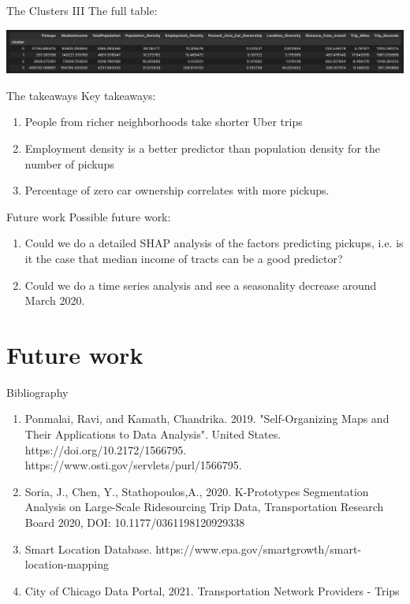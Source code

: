 \documentclass{beamer}
\begin{document}
\begin{frame}{The Clusters III}
	The full table:
	\begin{center}
	\includegraphics[scale=0.25]{full-table.png}
	\end{center}
\end{frame}
\begin{frame}{The takeaways}
	Key takeaways:
	\begin{enumerate}
		\item People from richer neighborhoods take shorter Uber trips
		\item Employment density is a better predictor than population density for the number of pickups
		\item Percentage of zero car ownership correlates with more pickups.
	\end{enumerate}
\end{frame}
\begin{frame}{Future work}
	Possible future work:
	\begin{enumerate}
		\item Could we do a detailed SHAP analysis of the factors predicting pickups, i.e. is it the case that median income of tracts can be a good predictor?
		\item Could we do a time series analysis and see a seasonality decrease around March 2020.
	\end{enumerate}
\end{frame}
\section{Future work}
\begin{frame}{Bibliography}
	\begin{enumerate}
		\item Ponmalai, Ravi, and Kamath, Chandrika. 2019. "Self-Organizing Maps and Their Applications to Data Analysis". United States. https://doi.org/10.2172/1566795. https://www.osti.gov/servlets/purl/1566795.
		\item Soria, J., Chen, Y., Stathopoulos,A., 2020. K-Prototypes Segmentation Analysis on Large-Scale Ridesourcing Trip Data, Transportation Research Board 2020, DOI: 10.1177/0361198120929338
		\item Smart Location Database. https://www.epa.gov/smartgrowth/smart- location-mapping
		\item City of Chicago Data Portal, 2021. Transportation Network Providers - Trips
	\end{enumerate}
\end{frame}
















    
    
    

    
    
\end{document}
